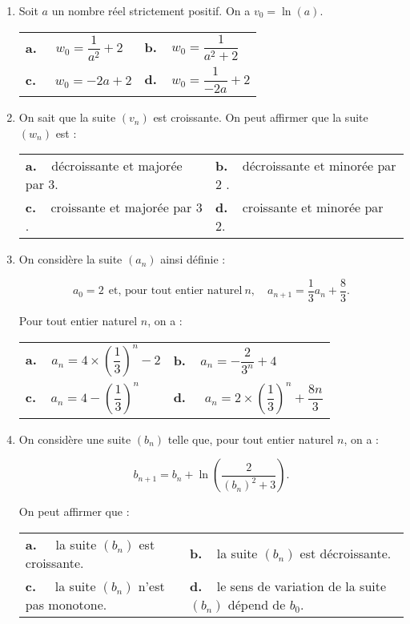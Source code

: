 \documentclass[11pt]{article}
\begin{document}
\begin{enumerate}[resume]
\item  Soit $a$ un nombre réel strictement positif. On a $v_0 = \ln (a)$.

\begin{center}
\begin{tabularx}{\linewidth}{X X}
\textbf{a.~~} $w_0 = \dfrac{1}{a^2}  +2$&\textbf{b.~~}$w_0 = \dfrac{1}{a^2  +2}$\\
\textbf{c.~~} $w_0 = -2a +2$&\textbf{d.~~}$w_0 = \dfrac{1}{- 2a} + 2$
\end{tabularx}
\end{center}

\item On sait que la suite $\left(v_n\right)$ est croissante. On peut affirmer que la suite $\left(w_n\right)$ est :

\begin{center}
\begin{tabularx}{\linewidth}{X X}
\textbf{a.~~}décroissante et majorée par 3.&\textbf{b.~~}décroissante et minorée par 2 .\\
\textbf{c.~~}croissante et majorée par 3 .&\textbf{d.~~}croissante et minorée par 2.
\end{tabularx}
\end{center}

\item On considère la suite $\left(a_n\right)$ ainsi définie :

\[a_0 = 2 \:\:\text{et, pour tout entier naturel}\: n, \quad a_{n+1} = \dfrac13a_n + \dfrac83.\]


Pour tout entier naturel $n$, on a :
\begin{center}
\begin{tabularx}{\linewidth}{X X}
\textbf{a.~~}$a_n = 4 \times \left(\dfrac13\right)^n - 2$&\textbf{b.~~}$a_n = - \dfrac{2}{3^n} + 4$\\
\textbf{c.~~}$a_n = 4 - \left(\dfrac13\right)^n$ & \textbf{d.~~} $a_n = 2 \times \left(\dfrac13\right)^n + \dfrac{8n}{3}$
\end{tabularx}
\end{center}
\item On considère une suite $\left(b_n\right)$ telle que, pour tout entier naturel $n$, on a :

\[b_{n+1} = b_n + \ln \left(\dfrac{2}{\left(b_n \right)^2 + 3}\right).\]

On peut affirmer que :

\begin{center}
\begin{tabularx}{\linewidth}{X X}
\textbf{a.~~} la suite $\left(b_n\right)$ est croissante.&\textbf{b.~~}la suite $\left(b_n\right)$ est décroissante.\\
\textbf{c.~~} la suite $\left(b_n\right)$ n'est pas monotone.&\textbf{d.~~}le sens de variation de la suite $\left(b_n\right)$ dépend de $b_0$.
\end{tabularx}
\end{center}


\end{enumerate}
\end{document}

